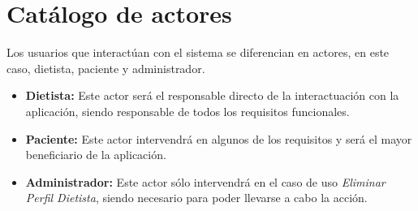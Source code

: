 

\section{Catálogo de actores}
Los usuarios que interactúan con el sistema se diferencian en actores, en este caso, dietista, paciente y administrador.
\begin{itemize}
\item \textbf{Dietista:} Este actor será el responsable directo de la interactuación con la aplicación, siendo responsable de todos los requisitos funcionales.
\item \textbf{Paciente:} Este actor intervendrá en algunos de los requisitos y será el mayor beneficiario de la aplicación.
\item \textbf{Administrador:} Este actor sólo intervendrá en el caso de uso \textit{Eliminar Perfil Dietista}, siendo necesario para poder llevarse a cabo la acción.
\end{itemize}

